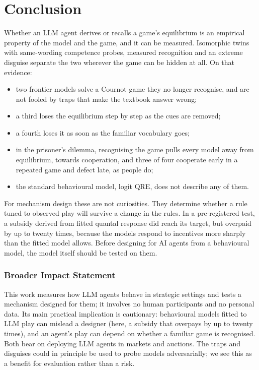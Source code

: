\documentclass[10pt]{article}
\theoremstyle{definition}
\theoremstyle{remark}
\begin{document}
\section{Conclusion}

Whether an LLM agent derives or recalls a game's equilibrium is an empirical property of the
model and the game, and it can be measured. Isomorphic twins with same-wording competence
probes, measured recognition and an extreme disguise separate the two wherever the game can be
hidden at all. On that evidence:
\begin{itemize}
\item two frontier models solve a Cournot game they no longer recognise, and are not fooled by
  traps that make the textbook answer wrong;
\item a third loses the equilibrium step by step as the cues are removed;
\item a fourth loses it as soon as the familiar vocabulary goes;
\item in the prisoner's dilemma, recognising the game pulls every model away from equilibrium,
  towards cooperation, and three of four cooperate early in a repeated game and defect late, as
  people do;
\item the standard behavioural model, logit QRE, does not describe any of them.
\end{itemize}
For mechanism design these are not curiosities. They determine whether a rule tuned to observed
play will survive a change in the rules. In a pre-registered test, a subsidy derived from fitted
quantal response did reach its target, but overpaid by up to twenty times, because the models
respond to incentives more sharply than the fitted model allows. Before designing for AI agents
from a behavioural model, the model itself should be tested on them.

\subsubsection*{Broader Impact Statement}
This work measures how LLM agents behave in strategic settings and tests a mechanism designed for
them; it involves no human participants and no personal data. Its main practical implication is
cautionary: behavioural models fitted to LLM play can mislead a designer (here, a subsidy that
overpays by up to twenty times), and an agent's play can depend on whether a familiar game is
recognised. Both bear on deploying LLM agents in markets and auctions. The traps and disguises
could in principle be used to probe models adversarially; we see this as a benefit for
evaluation rather than a risk.
\end{document}
